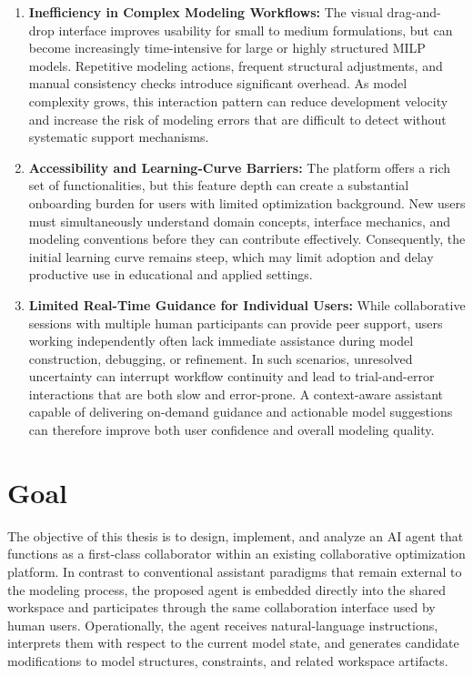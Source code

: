 \begin{enumerate}
    \item \textbf{Inefficiency in Complex Modeling Workflows:} The visual drag-and-drop interface improves usability for small to medium formulations, but can become increasingly time-intensive for large or highly structured MILP models. Repetitive modeling actions, frequent structural adjustments, and manual consistency checks introduce significant overhead. As model complexity grows, this interaction pattern can reduce development velocity and increase the risk of modeling errors that are difficult to detect without systematic support mechanisms.
    
    \item \textbf{Accessibility and Learning-Curve Barriers:} The platform offers a rich set of functionalities, but this feature depth can create a substantial onboarding burden for users with limited optimization background. New users must simultaneously understand domain concepts, interface mechanics, and modeling conventions before they can contribute effectively. Consequently, the initial learning curve remains steep, which may limit adoption and delay productive use in educational and applied settings.
    
    \item \textbf{Limited Real-Time Guidance for Individual Users:} While collaborative sessions with multiple human participants can provide peer support, users working independently often lack immediate assistance during model construction, debugging, or refinement. In such scenarios, unresolved uncertainty can interrupt workflow continuity and lead to trial-and-error interactions that are both slow and error-prone. A context-aware assistant capable of delivering on-demand guidance and actionable model suggestions can therefore improve both user confidence and overall modeling quality.
\end{enumerate}


\section{Goal}

The objective of this thesis is to design, implement, and analyze an AI agent that functions as a first-class collaborator within an existing collaborative optimization platform. In contrast to conventional assistant paradigms that remain external to the modeling process, the proposed agent is embedded directly into the shared workspace and participates through the same collaboration interface used by human users. Operationally, the agent receives natural-language instructions, interprets them with respect to the current model state, and generates candidate modifications to model structures, constraints, and related workspace artifacts.

